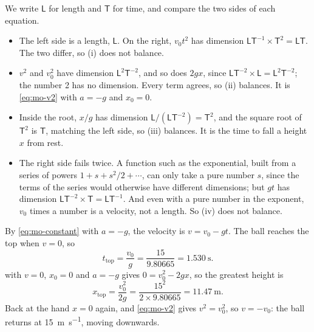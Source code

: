 \label{sec:mo-solutions}

We write $\mathsf{L}$ for length and
$\mathsf{T}$ for time, and compare the two sides of each equation.
\begin{itemize}
\item[(i)] The left side is a length, $\mathsf{L}$. On the right, $v_0
   t^2$ has dimension $\mathsf{L}\mathsf{T}^{-1}\times\mathsf{T}^2 =
   \mathsf{L}\mathsf{T}$. The two differ, so (i) does not balance.
\item[(ii)] $v^2$ and $v_0^2$ have dimension $\mathsf{L}^2\mathsf{T}^{-2}$,
   and so does $2gx$, since $\mathsf{L}\mathsf{T}^{-2}\times\mathsf{L} =
   \mathsf{L}^2\mathsf{T}^{-2}$; the number 2 has no dimension. Every
   term agrees, so (ii) balances. It is \cref{eq:mo-v2} with $a = -g$
   and $x_0 = 0$.
\item[(iii)] Inside the root, $x/g$ has dimension
   $\mathsf{L}/(\mathsf{L}\mathsf{T}^{-2}) = \mathsf{T}^2$, and the square
   root of $\mathsf{T}^2$ is $\mathsf{T}$, matching the left side, so
   (iii) balances. It is the time to fall a height $x$ from rest.
\item[(iv)] The right side fails twice. A function such as the
   exponential, built from a series of powers $1 + s + s^2/2 + \dotsb$,
   can only take a pure number $s$, since the terms of the series would
   otherwise have different dimensions; but $gt$ has dimension
   $\mathsf{L}\mathsf{T}^{-2}\times\mathsf{T} = \mathsf{L}\mathsf{T}^{-1}$.
   And even with a pure number in the exponent, $v_0$ times a number is a
   velocity, not a length. So (iv) does not balance.
\end{itemize}

By \cref{eq:mo-constant} with $a = -g$, the
velocity is $v = v_0 - gt$. The ball reaches the top when $v = 0$, so
\begin{equation*}
   t_{\mathrm{top}} = \frac{v_0}{g} = \frac{15}{9.80665}
   = \SI{1.530}{\second} .
\end{equation*}
 with $v = 0$, $x_0 = 0$ and $a = -g$ gives $0 = v_0^2 -
2gx$, so the greatest height is
\begin{equation*}
   x_{\mathrm{top}} = \frac{v_0^2}{2g} = \frac{15^2}{2\times9.80665}
   = \SI{11.47}{\metre} .
\end{equation*}
Back at the hand $x = 0$ again, and \cref{eq:mo-v2} gives $v^2 = v_0^2$,
so $v = -v_0$: the ball returns at \SI{15}{\metre\per\second}, moving
downwards.

